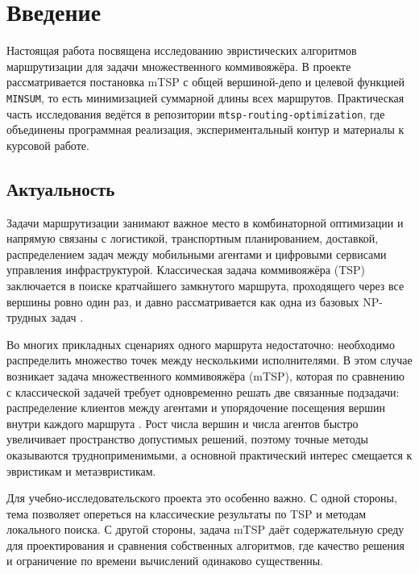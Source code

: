 \documentclass[a4paper,12pt]{article}
\begin{document}

\setcounter{page}{2}

{
  \hypersetup{linkcolor=black}
  \tableofcontents
}

\newpage

\section{Введение}

Настоящая работа посвящена исследованию эвристических алгоритмов маршрутизации для задачи множественного коммивояжёра. В проекте рассматривается постановка mTSP с общей вершиной-депо и целевой функцией \texttt{MINSUM}, то есть минимизацией суммарной длины всех маршрутов. Практическая часть исследования ведётся в репозитории \texttt{mtsp-routing-optimization}, где объединены программная реализация, экспериментальный контур и материалы к курсовой работе.

\subsection{Актуальность}

Задачи маршрутизации занимают важное место в комбинаторной оптимизации и напрямую связаны с логистикой, транспортным планированием, доставкой, распределением задач между мобильными агентами и цифровыми сервисами управления инфраструктурой. Классическая задача коммивояжёра (TSP) заключается в поиске кратчайшего замкнутого маршрута, проходящего через все вершины ровно один раз, и давно рассматривается как одна из базовых NP-трудных задач \cite{little1963,junger1995}.

Во многих прикладных сценариях одного маршрута недостаточно: необходимо распределить множество точек между несколькими исполнителями. В этом случае возникает задача множественного коммивояжёра (mTSP), которая по сравнению с классической задачей требует одновременно решать две связанные подзадачи: распределение клиентов между агентами и упорядочение посещения вершин внутри каждого маршрута \cite{bektas2006}. Рост числа вершин и числа агентов быстро увеличивает пространство допустимых решений, поэтому точные методы оказываются трудноприменимыми, а основной практический интерес смещается к эвристикам и метаэвристикам.

Для учебно-исследовательского проекта это особенно важно. С одной стороны, тема позволяет опереться на классические результаты по TSP и методам локального поиска. С другой стороны, задача mTSP даёт содержательную среду для проектирования и сравнения собственных алгоритмов, где качество решения и ограничение по времени вычислений одинаково существенны.
\end{document}
